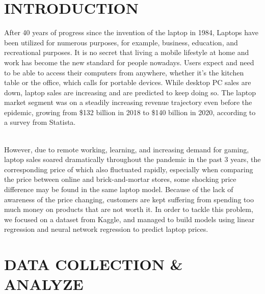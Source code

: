 \documentclass{scrartcl}
\begin{document}


\section{INTRODUCTION}

After 40 years of progress since the invention of the laptop in 1984, Laptops have been utilized for numerous purposes, for example, business, education, and recreational purposes. It is no secret that living a mobile lifestyle at home and work has become the new standard for people nowadays. Users expect and need to be able to access their computers from anywhere, whether it's the kitchen table or the office, which calls for portable devices. While desktop PC sales are down, laptop sales are increasing and are predicted to keep doing so. The laptop market segment was on a steadily increasing revenue trajectory even before the epidemic, growing from \$132 billion in 2018 to \$140 billion in 2020, according to a survey from Statista. \par
~\\
\noindent However, due to remote working, learning, and increasing demand for gaming, laptop sales soared dramatically throughout the pandemic in the past 3 years, the corresponding price of which also fluctuated rapidly, especially when comparing the price between online and brick-and-mortar stores, some shocking price difference may be found in the same laptop model. Because of the lack of awareness of the price changing, customers are kept suffering from spending too much money on products that are not worth it. In order to tackle this problem, we focused on a dataset from Kaggle, and managed to build models using linear regression and neural network regression\cite{chen} to predict laptop prices. 

\section{DATA COLLECTION & ANALYZE}
\end{document}
